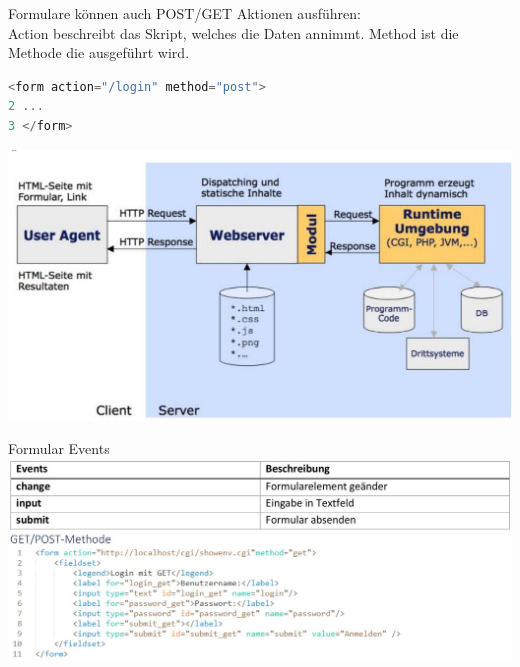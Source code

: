 Formulare können auch POST/GET Aktionen ausführen:\\
Action beschreibt das Skript, welches die Daten annimmt. Method ist die Methode die ausgeführt wird.

\begin{lstlisting}[language=JavaScript, style=basesmol]
<form action="/login" method="post">
2 ...
3 </form>
\end{lstlisting}

\begin{center}
\includegraphics[width=\linewidth]{images/2024_12_29_858f09cde51177c71657g-29(1)}
\end{center}

Formular Events\\
\includegraphics[width=\linewidth]{images/2024_12_29_858f09cde51177c71657g-30}

